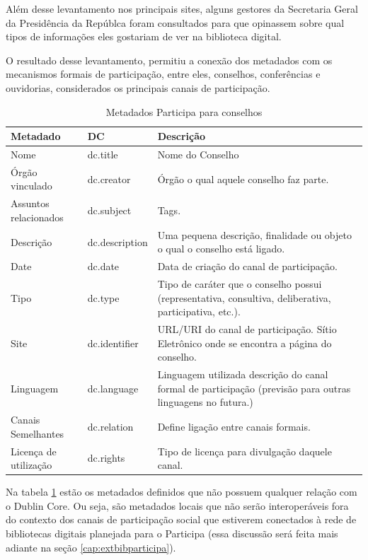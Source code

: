 Além desse levantamento nos principais sites, alguns gestores da Secretaria Geral da Presidência da Repúblca foram consultados para que opinassem sobre qual tipos de informações eles gostariam de ver na biblioteca digital. 

O resultado desse levantamento, permitiu a conexão dos metadados com os mecanismos formais de participação, entre eles, conselhos, conferências e ouvidorias, considerados os principais canais de participação.

\begin{table}[H]
	\begin{center}
    \begin{tabular}{| l | l | p{7cm} |}
    \hline
    \textbf{Metadado} & \textbf{DC} & \textbf{Descrição}  \\ \hline
    Nome & dc.title & Nome do Conselho \\ \hline
    Órgão vinculado & dc.creator & Órgão o qual aquele conselho faz parte. \\ \hline
    Assuntos relacionados & dc.subject & Tags. \\ \hline
    Descrição & dc.description & Uma pequena descrição, finalidade ou objeto o qual o conselho está ligado.\\ \hline
    Date & dc.date & Data de criação do canal de participação. \\ \hline
    Tipo & dc.type & Tipo de caráter que o conselho possui (representativa, consultiva, deliberativa, participativa, etc.). \\ \hline
    Site & dc.identifier & URL/URI do canal de participação. Sítio Eletrônico onde se encontra a página do conselho. \\ \hline
    Linguagem & dc.language & Linguagem utilizada descrição do canal formal de participação (previsão para outras linguagens no futura.) \\ \hline
    Canais Semelhantes & dc.relation & Define ligação entre canais formais. \\ \hline
    Licença de utilização & dc.rights & Tipo de licença para divulgação daquele canal. \\ \hline
    \end{tabular}
    \end{center}
    \caption{Metadados Participa para conselhos}
    \label{tab:metadata_participa}
\end{table}

Na tabela \ref{tab:metadata_participa} estão os metadados definidos que não possuem qualquer relação com o Dublin Core. Ou seja, são metadados locais que não serão interoperáveis fora do contexto dos canais de participação social que estiverem conectados à rede de bibliotecas digitais planejada para o Participa (essa discussão será feita mais adiante na seção \ref{cap:extbibparticipa}).

